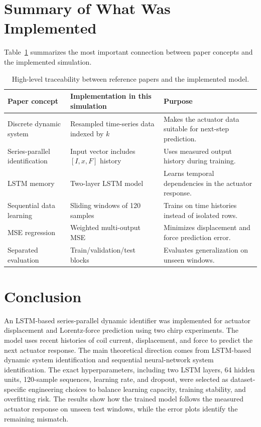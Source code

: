 \documentclass[11pt]{article}
\begin{document}
\section{Summary of What Was Implemented}
Table~\ref{tab:traceability} summarizes the most important connection between paper concepts and the implemented simulation.

\begin{table}[H]
\centering
\small
\begin{tabular}{p{4.1cm}p{4.6cm}p{5.8cm}}
\toprule
Paper concept & Implementation in this simulation & Purpose \\
\midrule
Discrete dynamic system \cite{wang2017} & Resampled time-series data indexed by $k$ & Makes the actuator data suitable for next-step prediction. \\
Series-parallel identification \cite{wang2017} & Input vector includes $[I,x,F]$ history & Uses measured output history during training. \\
LSTM memory \cite{wang2017} & Two-layer LSTM model & Learns temporal dependencies in the actuator response. \\
Sequential data learning \cite{ogunmolu2016} & Sliding windows of 120 samples & Trains on time histories instead of isolated rows. \\
MSE regression \cite{ogunmolu2016} & Weighted multi-output MSE & Minimizes displacement and force prediction error. \\
Separated evaluation \cite{ogunmolu2016} & Train/validation/test blocks & Evaluates generalization on unseen windows. \\
\bottomrule
\end{tabular}
\caption{High-level traceability between reference papers and the implemented model.}
\label{tab:traceability}
\end{table}

\section{Conclusion}
An LSTM-based series-parallel dynamic identifier was implemented for actuator displacement and Lorentz-force prediction using two chirp experiments. The model uses recent histories of coil current, displacement, and force to predict the next actuator response. The main theoretical direction comes from LSTM-based dynamic system identification and sequential neural-network system identification. The exact hyperparameters, including two LSTM layers, 64 hidden units, 120-sample sequences, learning rate, and dropout, were selected as dataset-specific engineering choices to balance learning capacity, training stability, and overfitting risk. The results show how the trained model follows the measured actuator response on unseen test windows, while the error plots identify the remaining mismatch.
\end{document}
